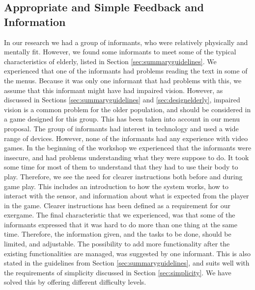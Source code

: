\subsection{Appropriate and Simple Feedback and Information}
In our research we had a group of informants, who were relatively physically and mentally fit. However, we found some informants to meet some of the typical characteristics of elderly, listed in Section \ref{sec:summaryguidelines}. We experienced that one of the informants had problems reading the text in some of the menus. Because it was only one informant that had problems with this, we assume that this informant might have had impaired vision. However, as discussed in Sections \ref{sec:summaryguidelines} and  \ref{sec:designelderly}, impaired vision is a common problem for the older population, and should be considered in a game designed for this group. This has been taken into account in our menu proposal. The group of informants had interest in technology and used a wide range of devices. However, none of the informants had any experience with video games. In the beginning of the workshop we experienced that the informants were insecure, and had problems understanding what they were suppose to do. It took some time for most of them to understand that they had to use their body to play. Therefore, we see the need for clearer instructions both before and during game play. This includes an introduction to how the system works, how to interact with the sensor, and information about what is expected from the player in the game. Clearer instructions has been defined as a requirement for our exergame. The final characteristic that we experienced, was that some of the informants expressed that it was hard to do more than one thing at the same time. Therefore, the information given, and the tasks to be done, should be limited, and adjustable. The possibility to add more functionality after the existing functionalities are managed, was suggested by one informant. This is also stated in the guidelines from Section \ref{sec:summaryguidelines}, and suits well with the requirements of simplicity discussed in Section \ref{sec:simplicity}. We have solved this by offering different difficulty levels. 

